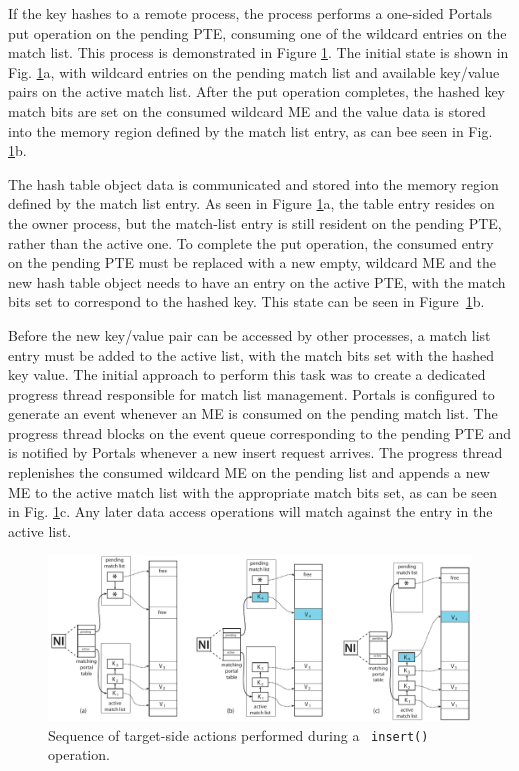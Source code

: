 If the key hashes to a remote process, the process performs a one-sided Portals
put operation on the pending PTE, consuming one of the wildcard entries on the
match list. This process is demonstrated in Figure \ref{fig:put}. The initial
state is shown in Fig. \ref{fig:put}a, with wildcard entries on the pending
match list and available key/value pairs on the active match list. After the
put operation completes, the hashed key match bits are set on the consumed
wildcard ME and the value data is stored into the memory region defined by the
match list entry, as can bee seen in Fig. \ref{fig:put}b.

The hash table object data is communicated and stored into the memory region defined by
the match list entry. As seen in Figure \ref{fig:put}a, the table entry
resides on the owner process, but the match-list entry is still resident
on the pending PTE, rather than the active one. To complete the put operation,
the consumed entry on the pending PTE must be replaced with a new empty,
wildcard ME and the new hash table object needs to have an entry on the active
PTE, with the match bits set to correspond to the hashed key. This state can be
seen in Figure~\ref{fig:put}b. 

Before the new key/value pair can be accessed by other processes, a match list
entry must be added to the active list, with the match bits set with the hashed
key value. The initial approach to perform this task was to create a dedicated
progress thread responsible for match list management. Portals is configured to
generate an event whenever an ME is consumed on the pending match list. The
progress thread blocks on the event queue corresponding to the pending PTE and
is notified by Portals whenever a new insert request arrives. The progress
thread replenishes the consumed wildcard ME on the pending list and appends a
new ME to the active match list with the appropriate match bits set, as can be
seen in Fig. \ref{fig:put}c. Any later data access operations will match
against the entry in the active list.


\begin{figure}
  \centering
  \includegraphics[width=0.85\linewidth]{figs/put}
  \caption{Sequence of target-side actions performed during a \pdht~{\tt insert()} operation.}
  \label{fig:put}
\end{figure}

